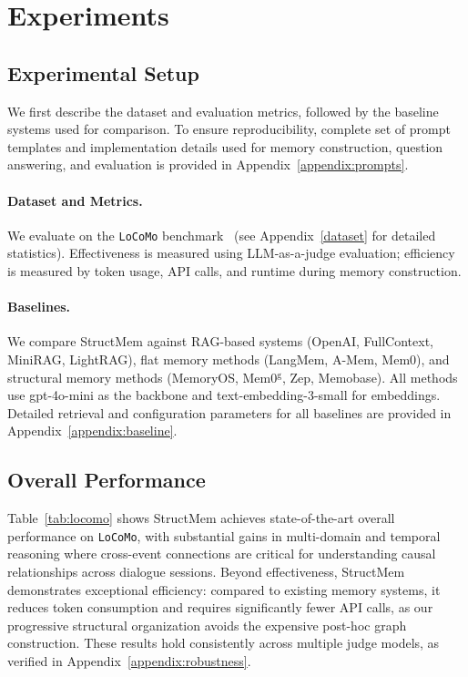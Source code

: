% 

\section{Experiments}
\subsection{Experimental Setup}
We first describe the dataset and evaluation metrics, followed by the baseline systems used for comparison. To ensure reproducibility, complete set of prompt templates and implementation details used for memory construction, question answering, and evaluation is provided in Appendix~\ref{appendix:prompts}.
\paragraph{Dataset and Metrics.} We evaluate on the \texttt{LoCoMo} benchmark~\cite{maharana2024evaluating} (see Appendix~\ref{dataset} for detailed statistics). Effectiveness is measured using LLM-as-a-judge evaluation; efficiency is measured by token usage, API calls, and runtime during memory construction.

\paragraph{Baselines.} We compare StructMem against RAG-based systems (OpenAI, FullContext, MiniRAG, LightRAG), flat memory methods (LangMem, A-Mem, Mem0), and structural memory methods (MemoryOS, Mem0$^\text{g}$, Zep, Memobase). All methods use gpt-4o-mini as the backbone and text-embedding-3-small for embeddings. Detailed retrieval and configuration parameters for all baselines are provided in Appendix~\ref{appendix:baseline}.

\subsection{Overall Performance}

Table~\ref{tab:locomo} shows StructMem achieves state-of-the-art overall performance on \texttt{LoCoMo}, with substantial gains in multi-domain and temporal reasoning where cross-event connections are critical for understanding causal relationships across dialogue sessions. Beyond effectiveness, StructMem demonstrates exceptional efficiency: compared to existing memory systems, it reduces token consumption and requires significantly fewer API calls, as our progressive structural organization avoids the expensive post-hoc graph construction. These results hold consistently across multiple judge models, as verified in Appendix~\ref{appendix:robustness}.

